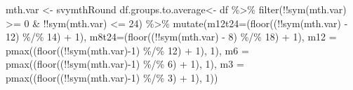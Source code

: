 \documentclass[
]{book}
\newenvironment{Shaded}{\begin{snugshade}}{\end{snugshade}}
\newcommand{\AttributeTok}[1]{\textcolor[rgb]{0.77,0.63,0.00}{#1}}
\newcommand{\DecValTok}[1]{\textcolor[rgb]{0.00,0.00,0.81}{#1}}
\newcommand{\FunctionTok}[1]{\textcolor[rgb]{0.00,0.00,0.00}{#1}}
\newcommand{\NormalTok}[1]{#1}
\newcommand{\OtherTok}[1]{\textcolor[rgb]{0.56,0.35,0.01}{#1}}
\newcommand{\SpecialCharTok}[1]{\textcolor[rgb]{0.00,0.00,0.00}{#1}}
\newcommand{\StringTok}[1]{\textcolor[rgb]{0.31,0.60,0.02}{#1}}
\begin{document}
\begin{Shaded}
\begin{Highlighting}[]
\NormalTok{mth.var }\OtherTok{\textless{}{-}} \StringTok{\textquotesingle{}svymthRound\textquotesingle{}}
\NormalTok{df.groups.to.average}\OtherTok{\textless{}{-}}\NormalTok{ df }\SpecialCharTok{\%\textgreater{}\%}
        \FunctionTok{filter}\NormalTok{(}\SpecialCharTok{!!}\FunctionTok{sym}\NormalTok{(mth.var) }\SpecialCharTok{\textgreater{}=} \DecValTok{0} \SpecialCharTok{\&} \SpecialCharTok{!!}\FunctionTok{sym}\NormalTok{(mth.var) }\SpecialCharTok{\textless{}=} \DecValTok{24}\NormalTok{)  }\SpecialCharTok{\%\textgreater{}\%}
        \FunctionTok{mutate}\NormalTok{(}\AttributeTok{m12t24=}\NormalTok{(}\FunctionTok{floor}\NormalTok{((}\SpecialCharTok{!!}\FunctionTok{sym}\NormalTok{(mth.var) }\SpecialCharTok{{-}} \DecValTok{12}\NormalTok{) }\SpecialCharTok{\%/\%} \DecValTok{14}\NormalTok{) }\SpecialCharTok{+} \DecValTok{1}\NormalTok{),}
               \AttributeTok{m8t24=}\NormalTok{(}\FunctionTok{floor}\NormalTok{((}\SpecialCharTok{!!}\FunctionTok{sym}\NormalTok{(mth.var) }\SpecialCharTok{{-}} \DecValTok{8}\NormalTok{) }\SpecialCharTok{\%/\%} \DecValTok{18}\NormalTok{) }\SpecialCharTok{+} \DecValTok{1}\NormalTok{),}
               \AttributeTok{m12 =} \FunctionTok{pmax}\NormalTok{((}\FunctionTok{floor}\NormalTok{((}\SpecialCharTok{!!}\FunctionTok{sym}\NormalTok{(mth.var)}\SpecialCharTok{{-}}\DecValTok{1}\NormalTok{) }\SpecialCharTok{\%/\%} \DecValTok{12}\NormalTok{) }\SpecialCharTok{+} \DecValTok{1}\NormalTok{), }\DecValTok{1}\NormalTok{),}
               \AttributeTok{m6 =} \FunctionTok{pmax}\NormalTok{((}\FunctionTok{floor}\NormalTok{((}\SpecialCharTok{!!}\FunctionTok{sym}\NormalTok{(mth.var)}\SpecialCharTok{{-}}\DecValTok{1}\NormalTok{) }\SpecialCharTok{\%/\%} \DecValTok{6}\NormalTok{) }\SpecialCharTok{+} \DecValTok{1}\NormalTok{), }\DecValTok{1}\NormalTok{),}
               \AttributeTok{m3 =} \FunctionTok{pmax}\NormalTok{((}\FunctionTok{floor}\NormalTok{((}\SpecialCharTok{!!}\FunctionTok{sym}\NormalTok{(mth.var)}\SpecialCharTok{{-}}\DecValTok{1}\NormalTok{) }\SpecialCharTok{\%/\%} \DecValTok{3}\NormalTok{) }\SpecialCharTok{+} \DecValTok{1}\NormalTok{), }\DecValTok{1}\NormalTok{))}
\end{Highlighting}
\end{Shaded}
\end{document}

